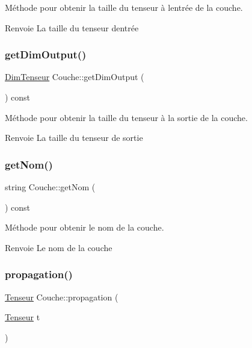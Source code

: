 Méthode pour obtenir la taille du tenseur à l\textquotesingle{}entrée de la couche. 

\begin{DoxyReturn}{Renvoie}
La taille du tenseur d\textquotesingle{}entrée 
\end{DoxyReturn}
\mbox{\label{classCouche_ae8c80adf3a53da0d975e6f1148d0cea9}} 
\subsubsection{\texorpdfstring{get\+Dim\+Output()}{getDimOutput()}}
{\footnotesize\ttfamily \hyperlink{classDimTenseur}{Dim\+Tenseur} Couche\+::get\+Dim\+Output (\begin{DoxyParamCaption}{ }\end{DoxyParamCaption}) const}



Méthode pour obtenir la taille du tenseur à la sortie de la couche. 

\begin{DoxyReturn}{Renvoie}
La taille du tenseur de sortie 
\end{DoxyReturn}
\mbox{\label{classCouche_a367bb58eaafab2b5fe635e6d3350fe4b}} 
\subsubsection{\texorpdfstring{get\+Nom()}{getNom()}}
{\footnotesize\ttfamily string Couche\+::get\+Nom (\begin{DoxyParamCaption}{ }\end{DoxyParamCaption}) const}



Méthode pour obtenir le nom de la couche. 

\begin{DoxyReturn}{Renvoie}
Le nom de la couche 
\end{DoxyReturn}
\mbox{\label{classCouche_a1f0ed59e21020f5d4f37933af4d1b1e5}} 
\subsubsection{\texorpdfstring{propagation()}{propagation()}}
{\footnotesize\ttfamily \hyperlink{classTenseur}{Tenseur} Couche\+::propagation (\begin{DoxyParamCaption}\item[{\hyperlink{classTenseur}{Tenseur}}]{t }\end{DoxyParamCaption})\hspace{0.3cm}{\ttfamily [virtual]}}



